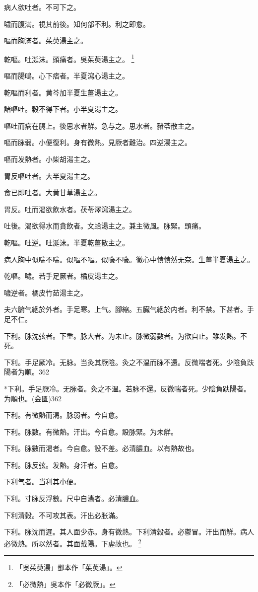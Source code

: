 \documentclass[12pt,twoside,UTF8,b5paper]{ctexbook}
\begin{document}
病人欲吐者。不可下之。

噦而腹滿。視其前後。知何部不利。利之即愈。

嘔而胸滿者。茱萸湯主之。

乾嘔。吐涎沫。頭痛者。吳茱萸湯主之。
	\footnote{「吳茱萸湯」鄧本作「茱萸湯」。}

嘔而腸鳴。心下痞者。半夏瀉心湯主之。

乾嘔而利者。黄芩加半夏生薑湯主之。

諸嘔吐。穀不得下者。小半夏湯主之。

嘔吐而病在膈上。後思水者觧。急与之。思水者。豬苓散主之。

嘔而脉弱。小便復利。身有微熱。見厥者難治。四逆湯主之。

嘔而发熱者。小柴胡湯主之。

胃反嘔吐者。大半夏湯主之。

食已即吐者。大黄甘草湯主之。

胃反。吐而渴欲飲水者。茯苓澤瀉湯主之。

吐後。渴欲得水而貪飲者。文蛤湯主之。兼主微風。脉緊。頭痛。

乾嘔。吐逆。吐涎沫。半夏乾薑散主之。

病人胸中似喘不喘。似嘔不嘔。似噦不噦。徹心中憒憒然无奈。生薑半夏湯主之。

乾嘔。噦。若手足厥者。橘皮湯主之。

噦逆者。橘皮竹茹湯主之。

夫六腑气絶於外者。手足寒。上气。腳縮。五臓气絶於内者。利不禁。下甚者。手足不仁。

下利。脉沈弦者。下重。脉大者。为未止。脉微弱數者。为欲自止。雖发熱。不死。

下利。手足厥{冷}。无脉。{当灸其厥陰。}灸之不温{而脉不還}。反微喘者死。少陰負趺陽者为順。362

*下利。手足厥冷。无脉者。灸之不温。若脉不還。反微喘者死。少陰負趺陽者。为順也。(金匱)362

下利。有微熱而渴。脉弱者。今自愈。

下利。脉數。有微熱。汗出。今自愈。設脉緊。为未觧。

下利。脉數而渴者。今自愈。設不差。必清膿血。以有熱故也。

下利。脉反弦。发熱。身汗者。自愈。

下利气者。当利其小便。

下利。寸脉反浮數。尺中自濇者。必清膿血。

下利清穀。不可攻其表。汗出必胀滿。

下利。脉沈而遲。其人面少赤。身有微熱。下利清穀者。必鬱冒。汗出而觧。病人必微熱。所以然者。其面戴陽。下虗故也。
	\footnote{「必微熱」吳本作「必微厥」。}
\end{document}
